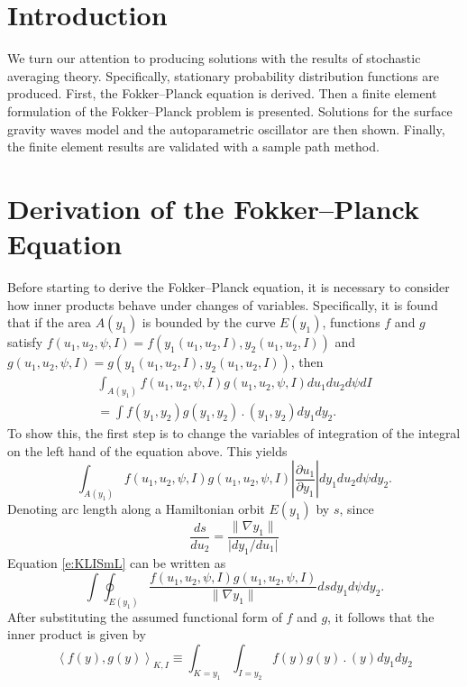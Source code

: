 \section{Introduction}

We turn our attention to producing solutions with the results of stochastic averaging theory. Specifically, stationary probability distribution functions are produced. First, the Fokker--Planck equation is derived. Then a finite element formulation of the Fokker--Planck problem is presented. Solutions for the surface gravity waves model and the autoparametric oscillator are then shown. Finally, the finite element results are validated with a sample path method.

\section{Derivation of the Fokker--Planck Equation}
Before starting to derive the Fokker--Planck equation, it is necessary to consider how inner products behave under changes of variables. Specifically, it is found that if the area $A(y_1)$ is bounded by the curve $E(y_1)$, functions $f$ and $g$ satisfy $f(u_1,u_2,\psi,I) = f(y_1(u_1,u_2,I),y_2(u_1,u_2,I))$ and $g(u_1,u_2,\psi,I) = g(y_1(u_1,u_2,I),y_2(u_1,u_2,I))$, then
\begin{multline*}
\int_{A(y_1)} f(u_1,u_2,\psi,I) g(u_1,u_2,\psi,I) du_1 du_2 d\psi dI\\
= \int f(y_1,y_2) g(y_1, y_2) \period(y_1,y_2) dy_1 dy_2.
\end{multline*}
To show this, the first step is to change the variables of integration of the integral on the left hand of the equation above. This yields
\begin{equation}
\label{e:KLISmL}
\int_{A(y_1)} f(u_1,u_2,\psi,I) g(u_1,u_2,\psi,I) \left\lvert\frac{\partial u_1}{\partial y_1}\right\rvert dy_1 du_2 d\psi dy_2.
\end{equation}
Denoting arc length along a Hamiltonian orbit $E(y_1)$ by $s$, since
\[
\frac{ds}{du_2} = \frac{\lVert \nabla y_1 \rVert}{\lvert dy_1/du_1\rvert}
\]
Equation \eqref{e:KLISmL} can be written as
\[
\int \oint_{E(y_1)} \frac{f(u_1,u_2,\psi,I) g(u_1,u_2,\psi,I)}{\lVert \nabla y_1 \rVert} ds dy_1 d\psi dy_2.
\]
After substituting the assumed functional form of $f$ and $g$, it follows that the inner product is given by
\[
\left\langle f(y), g(y) \right\rangle_{K,I} \equiv \int_{K=y_1} \int_{I=y_2} f(y) g(y) \period (y) dy_1 dy_2
\]

